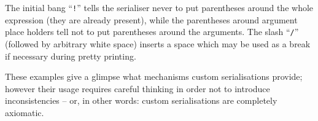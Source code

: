 \begin{isabellebody}
\endisatagquotett
{\isafoldquotett}%
%
\isadelimquotett
%
\endisadelimquotett
%
\begin{isamarkuptext}%
\noindent The initial bang ``\verb|!|'' tells the serialiser
  never to put parentheses around the whole expression (they are
  already present), while the parentheses around argument place
  holders tell not to put parentheses around the arguments.  The slash
  ``\verb|/|'' (followed by arbitrary white space) inserts a
  space which may be used as a break if necessary during pretty
  printing.

  These examples give a glimpse what mechanisms custom serialisations
  provide; however their usage requires careful thinking in order not
  to introduce inconsistencies -- or, in other words: custom
  serialisations are completely axiomatic.


\end{isamarkuptext}
\end{isabellebody}
